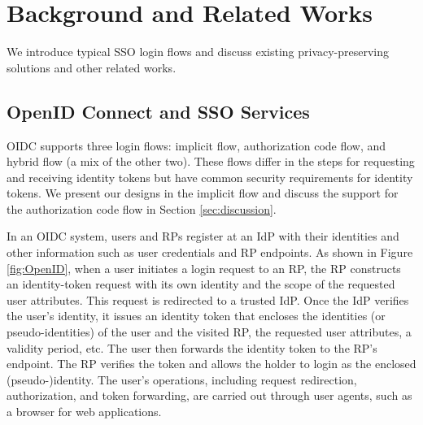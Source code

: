 \section{Background and Related Works}
\label{sec:background}

We introduce %
typical SSO login flows and discuss existing privacy-preserving solutions and other related works.

\subsection{OpenID Connect and SSO Services}
\label{subsec:OIDC}
OIDC supports three login flows: implicit flow, authorization code flow, and hybrid flow (a mix of the other two).
These flows differ in the steps for requesting and receiving identity tokens but have common security requirements for identity tokens.
We present our designs in the implicit flow and discuss the support for the authorization code flow in Section \ref{sec:discussion}.

In an OIDC system, users and RPs register at an IdP with their identities
and other information such as user credentials %
and RP endpoints. %
As shown in Figure \ref{fig:OpenID}, when a user initiates a login request to an RP, the RP constructs an identity-token request with its own identity and the scope of the requested user attributes.
This request is redirected to a trusted IdP.
Once the IdP verifies the user's identity, it issues an identity token that encloses the identities (or pseudo-identities) of the user and the visited RP, the requested user attributes, a validity period, etc. The user then forwards the identity token to the RP's endpoint. The RP verifies the token and allows the holder to login as the enclosed (pseudo-)identity.
The user's operations, including request redirection, authorization, and token forwarding, are carried out through user agents, such as a browser for web applications.

